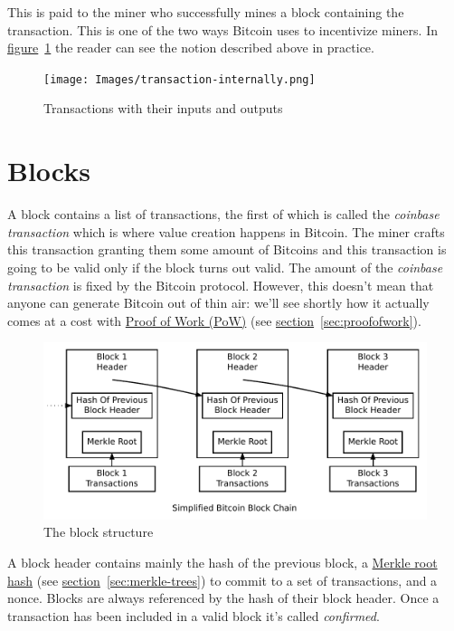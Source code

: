 This is paid to the miner who successfully mines a block containing the transaction. This is one of the two ways Bitcoin uses to incentivize miners. In \hyperref[fig:transaction-internally]{figure}~\ref{fig:transaction-internally} the reader can see the notion described above in practice.

\begin{figure}[ht]
  \centering
  \texttt{[image: Images/transaction-internally.png]}
  \caption{Transactions with their inputs and outputs~\cite{mastering}}
  \label{fig:transaction-internally}
\end{figure}

\section{Blocks} \label{sec:blocks}
A block contains a list of transactions, the first of which is called the \emph{coinbase transaction} which is where value creation happens in Bitcoin. The miner crafts this transaction granting them some amount of Bitcoins and this transaction is going to be valid only if the block turns out valid. The amount of the \emph{coinbase transaction} is fixed by the Bitcoin protocol. However, this doesn't mean that anyone can generate Bitcoin out of thin air: we'll see shortly how it actually comes at a cost with \hyperref[sec:proofofwork]{Proof of Work (PoW)} (see \hyperref[sec:proofofwork]{section}~\ref{sec:proofofwork}).

\begin{figure}[bh]
  \centering
  \includegraphics[width=0.9\columnwidth,keepaspectratio]{Images/block-structure.pdf}
  \caption{The block structure~\cite{Nakamoto_bitcoin:a}}
  \label{fig:block-structure}
\end{figure}
\pagebreak

A block header contains mainly the hash of the previous block, a \hyperref[sec:merkle-trees]{Merkle root hash} (see \hyperref[sec:merkle-trees]{section}~\ref{sec:merkle-trees}) to commit to a set of transactions, and a nonce. Blocks are always referenced by the hash of their block header. Once a transaction has been included in a valid block it's called \emph{confirmed}.

